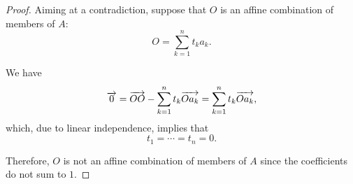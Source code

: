 \begin{proof}
  Aiming at a contradiction, suppose that \( O \) is an affine combination of members of \( A \):
  \begin{equation*}
    O = \sum_{k=1}^n t_k a_k.
  \end{equation*}

  We have
  \begin{equation*}
    \overrightarrow{0}
    =
    \overrightarrow{O O} - \sum_{k=1}^n t_k \overrightarrow{O a_k}
    =
    \sum_{k=1}^n t_k \overrightarrow{O a_k},
  \end{equation*}
  which, due to linear independence, implies that
  \begin{equation*}
    t_1 = \cdots = t_n = 0.
  \end{equation*}

  Therefore, \( O \) is not an affine combination of members of \( A \) since the coefficients do not sum to \( 1 \).
\end{proof}

